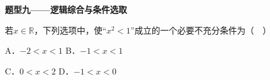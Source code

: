 \documentclass[12pt,a4paper]{article}
\newcommand{\qtitle}[1]{{\Large\bfseries\color[HTML]{1F3864}#1}\par\vspace{0.9em}}
\begin{document}
\qtitle{题型九——逻辑综合与条件选取}

若$x\in\mathbb{R}$，下列选项中，使“$x^2<1$”成立的一个必要不充分条件为（　）\par
\vspace{0.9em}
A．$-2<x<1$ \qquad\qquad B．$-1<x<1$\par
\vspace{0.45em}
C．$0<x<2$ \qquad\qquad D．$-1<x<0$\par
\vspace{0.45em}
\end{document}
